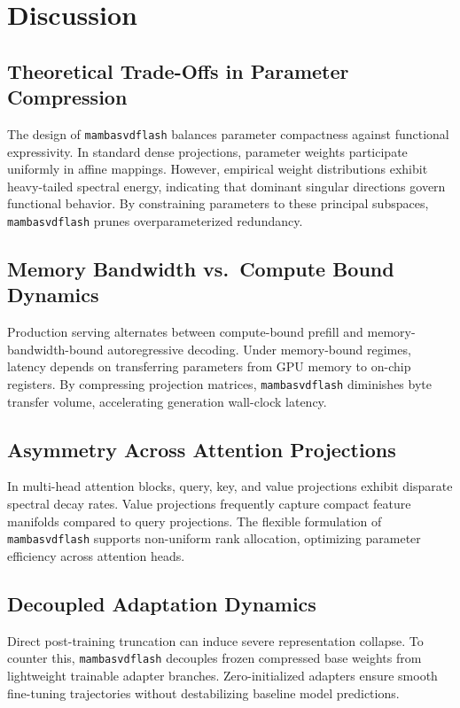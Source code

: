 \section{Discussion}

\subsection{Theoretical Trade-Offs in Parameter Compression}
The design of \texttt{mambasvdflash} balances parameter compactness against functional expressivity. In standard dense projections, parameter weights participate uniformly in affine mappings. However, empirical weight distributions exhibit heavy-tailed spectral energy, indicating that dominant singular directions govern functional behavior. By constraining parameters to these principal subspaces, \texttt{mambasvdflash} prunes overparameterized redundancy.

\subsection{Memory Bandwidth vs.\ Compute Bound Dynamics}
Production serving alternates between compute-bound prefill and memory-bandwidth-bound autoregressive decoding. Under memory-bound regimes, latency depends on transferring parameters from GPU memory to on-chip registers. By compressing projection matrices, \texttt{mambasvdflash} diminishes byte transfer volume, accelerating generation wall-clock latency.

\subsection{Asymmetry Across Attention Projections}
In multi-head attention blocks, query, key, and value projections exhibit disparate spectral decay rates. Value projections frequently capture compact feature manifolds compared to query projections. The flexible formulation of \texttt{mambasvdflash} supports non-uniform rank allocation, optimizing parameter efficiency across attention heads.

\subsection{Decoupled Adaptation Dynamics}
Direct post-training truncation can induce severe representation collapse. To counter this, \texttt{mambasvdflash} decouples frozen compressed base weights from lightweight trainable adapter branches. Zero-initialized adapters ensure smooth fine-tuning trajectories without destabilizing baseline model predictions.

